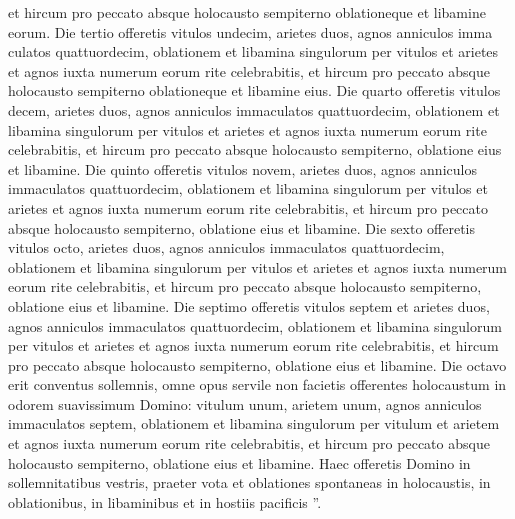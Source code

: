\begin{biblechapter}
\begin{biblechapter}
\begin{biblechapter}
\begin{biblechapter}
\begin{biblechapter}
\begin{biblechapter}
\begin{biblechapter}
\begin{biblechapter}
\begin{biblechapter}
\begin{biblechapter}
\begin{biblechapter}
\begin{biblechapter}
\begin{biblechapter}
\begin{biblechapter}
\begin{biblechapter}
\begin{biblechapter}
\begin{biblechapter}
\begin{biblechapter}
\begin{biblechapter}
\begin{biblechapter}
\begin{biblechapter}
\begin{biblechapter}
\begin{biblechapter}
\begin{biblechapter}
\begin{biblechapter}
\begin{biblechapter}
\begin{biblechapter}
\begin{biblechapter}
\begin{biblechapter}
\verse et hircum pro peccato absque holocausto sempiterno oblationeque et libamine eorum. 
\verse Die tertio offeretis vitulos undecim, arietes duos, agnos anniculos imma culatos quattuordecim, 
\verse oblationem et libamina singulorum per vitulos et arietes et agnos iuxta numerum eorum rite celebrabitis, 
\verse et hircum pro peccato absque holocausto sempiterno oblationeque et libamine eius. 
\verse Die quarto offeretis vitulos decem, arietes duos, agnos anniculos immaculatos quattuordecim, 
\verse oblationem et libamina singulorum per vitulos et arietes et agnos iuxta numerum eorum rite celebrabitis, 
\verse et hircum pro peccato absque holocausto sempiterno, oblatione eius et libamine. 
\verse Die quinto offeretis vitulos novem, arietes duos, agnos anniculos immaculatos quattuordecim, 
\verse oblationem et libamina singulorum per vitulos et arietes et agnos iuxta numerum eorum rite celebrabitis, 
\verse et hircum pro peccato absque holocausto sempiterno, oblatione eius et libamine. 
\verse Die sexto offeretis vitulos octo, arietes duos, agnos anniculos immaculatos quattuordecim, 
\verse oblationem et libamina singulorum per vitulos et arietes et agnos iuxta numerum eorum rite celebrabitis, 
\verse et hircum pro peccato absque holocausto sempiterno, oblatione eius et libamine. 
\verse Die septimo offeretis vitulos septem et arietes duos, agnos anniculos immaculatos quattuordecim, 
\verse oblationem et libamina singulorum per vitulos et arietes et agnos iuxta numerum eorum rite celebrabitis, 
\verse et hircum pro peccato absque holocausto sempiterno, oblatione eius et libamine. 
\verse Die octavo erit conventus sollemnis, omne opus servile non facietis 
\verse offerentes holocaustum in odorem suavissimum Domino: vitulum unum, arietem unum, agnos anniculos immaculatos septem, 
\verse oblationem et libamina singulorum per vitulum et arietem et agnos iuxta numerum eorum rite celebrabitis, 
\verse et hircum pro peccato absque holocausto sempiterno, oblatione eius et libamine.
 \verse Haec offeretis Domino in sollemnitatibus vestris, praeter vota et oblationes spontaneas in holocaustis, in oblationibus, in libaminibus et in hostiis pacificis ”.
 

\end{biblechapter}
\end{biblechapter}
\end{biblechapter}
\end{biblechapter}
\end{biblechapter}
\end{biblechapter}
\end{biblechapter}
\end{biblechapter}
\end{biblechapter}
\end{biblechapter}
\end{biblechapter}
\end{biblechapter}
\end{biblechapter}
\end{biblechapter}
\end{biblechapter}
\end{biblechapter}
\end{biblechapter}
\end{biblechapter}
\end{biblechapter}
\end{biblechapter}
\end{biblechapter}
\end{biblechapter}
\end{biblechapter}
\end{biblechapter}
\end{biblechapter}
\end{biblechapter}
\end{biblechapter}
\end{biblechapter}
\end{biblechapter}
